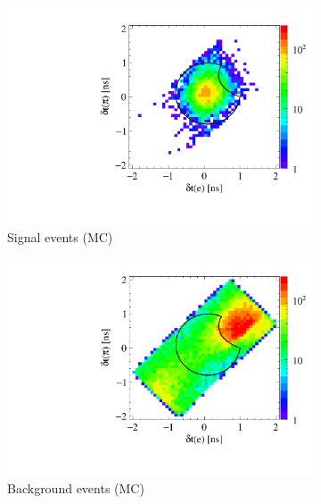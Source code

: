 \begin{figure}[h!]
  \centering
\captionsetup[subfigure]{justification=centering}
  \begin{subfigure}{0.45\textwidth}
    \includegraphics[width=1.0\textwidth]{Chapter7_analysis_kloe/img/tof3_signal}
    \caption{Signal events (MC)}\label{fig:tof3_cut_1}
  \end{subfigure}
  \begin{subfigure}{0.45\textwidth}
    \includegraphics[width=1.0\textwidth]{Chapter7_analysis_kloe/img/tof3_background}
    \caption{Background events (MC)}
  \end{subfigure}
  \begin{subfigure}{0.45\textwidth}

\end{subfigure}
\end{figure}
